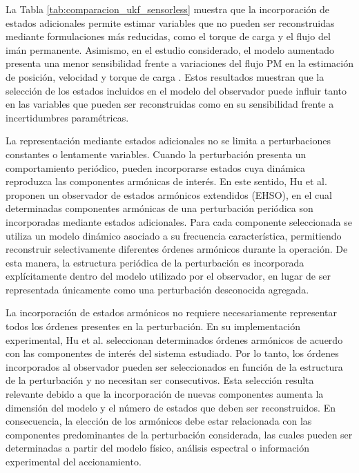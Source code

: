 La Tabla \ref{tab:comparacion_ukf_sensorless} muestra que la incorporación de estados adicionales permite estimar variables que no pueden ser reconstruidas mediante formulaciones más reducidas, como el torque de carga y el flujo del imán permanente. Asimismo, en el estudio considerado, el modelo aumentado presenta una menor sensibilidad frente a variaciones del flujo PM en la estimación de posición, velocidad y torque de carga \cite{horvathLoadTorquePermanent2023}. Estos resultados muestran que la selección de los estados incluidos en el modelo del observador puede influir tanto en las variables que pueden ser reconstruidas como en su sensibilidad frente a incertidumbres paramétricas.



La representación mediante estados adicionales no se limita a perturbaciones constantes o lentamente variables. Cuando la perturbación presenta un comportamiento periódico, pueden incorporarse estados cuya dinámica reproduzca las componentes armónicas de interés. En este sentido, Hu et al. \cite{huSelectivePeriodicDisturbance2022} proponen un observador de estados armónicos extendidos (EHSO), en el cual determinadas componentes armónicas de una perturbación periódica son incorporadas mediante estados adicionales. Para cada componente seleccionada se utiliza un modelo dinámico asociado a su frecuencia característica, permitiendo reconstruir selectivamente diferentes órdenes armónicos durante la operación. De esta manera, la estructura periódica de la perturbación es incorporada explícitamente dentro del modelo utilizado por el observador, en lugar de ser representada únicamente como una perturbación desconocida agregada.



La incorporación de estados armónicos no requiere necesariamente representar todos los órdenes presentes en la perturbación. En su implementación experimental, Hu et al. \cite{huSelectivePeriodicDisturbance2022} seleccionan determinados órdenes armónicos de acuerdo con las componentes de interés del sistema estudiado. Por lo tanto, los órdenes incorporados al observador pueden ser seleccionados en función de la estructura de la perturbación y no necesitan ser consecutivos. Esta selección resulta relevante debido a que la incorporación de nuevas componentes aumenta la dimensión del modelo y el número de estados que deben ser reconstruidos. En consecuencia, la elección de los armónicos debe estar relacionada con las componentes predominantes de la perturbación considerada, las cuales pueden ser determinadas a partir del modelo físico, análisis espectral o información experimental del accionamiento.


